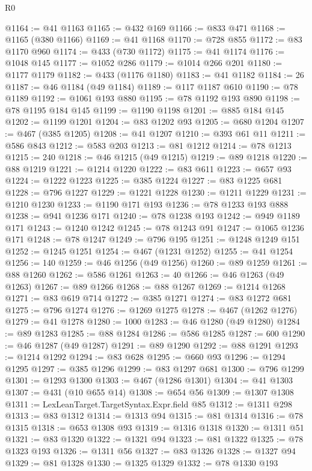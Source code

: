 \begin{lexlean}{R0}
\begin{coremodule}
@1164 := @41 @1163
@1165 := @432 @169
@1166 := @833 @471
@1168 := @1165 (@380 @1166)
@1169 := @41 @1168
@1170 := @728 @855
@1172 := @83 @1170 @960
@1174 := @433 (@730 @1172)
@1175 := @41 @1174
@1176 := @1048 @145
@1177 := @1052 @286
@1179 := @1014 @266 @201
@1180 := @1177 @1179
@1182 := @433 (@1176 @1180)
@1183 := @41 @1182
@1184 := 26
@1187 := @46 @1184 (@49 @1184)
@1189 := @117 @1187 @610
@1190 := @78 @1189
@1192 := @1061 @193 @880
@1195 := @78 @1192 @193 @890
@1198 := @78 @1195 @184 @145
@1199 := @1190 @1198
@1201 := @885 @184 @145
@1202 := @1199 @1201
@1204 := @83 @1202 @93
@1205 := @680 @1204
@1207 := @467 (@385 @1205)
@1208 := @41 @1207
@1210 := @393 @61 @11
@1211 := @586 @843
@1212 := @583 @203
@1213 := @81 @1212
@1214 := @78 @1213
@1215 := 240
@1218 := @46 @1215 (@49 @1215)
@1219 := @89 @1218
@1220 := @88 @1219
@1221 := @1214 @1220
@1222 := @83 @611
@1223 := @657 @93
@1224 := @1222 @1223
@1225 := @385 @1224
@1227 := @83 @1225 @681
@1228 := @796 @1227
@1229 := @1221 @1228
@1230 := @1211 @1229
@1231 := @1210 @1230
@1233 := @1190 @171 @193
@1236 := @78 @1233 @193 @888
@1238 := @941 @1236 @171
@1240 := @78 @1238 @193
@1242 := @949 @1189 @171
@1243 := @1240 @1242
@1245 := @78 @1243 @91
@1247 := @1065 @1236 @171
@1248 := @78 @1247
@1249 := @796 @195
@1251 := @1248 @1249 @151
@1252 := @1245 @1251
@1254 := @467 (@1231 @1252)
@1255 := @41 @1254
@1256 := 140
@1259 := @46 @1256 (@49 @1256)
@1260 := @89 @1259
@1261 := @88 @1260
@1262 := @586 @1261
@1263 := 40
@1266 := @46 @1263 (@49 @1263)
@1267 := @89 @1266
@1268 := @88 @1267
@1269 := @1214 @1268
@1271 := @83 @619 @714
@1272 := @385 @1271
@1274 := @83 @1272 @681
@1275 := @796 @1274
@1276 := @1269 @1275
@1278 := @467 (@1262 @1276)
@1279 := @41 @1278
@1280 := 1000
@1283 := @46 @1280 (@49 @1280)
@1284 := @89 @1283
@1285 := @88 @1284
@1286 := @586 @1285
@1287 := 600
@1290 := @46 @1287 (@49 @1287)
@1291 := @89 @1290
@1292 := @88 @1291
@1293 := @1214 @1292
@1294 := @83 @628
@1295 := @660 @93
@1296 := @1294 @1295
@1297 := @385 @1296
@1299 := @83 @1297 @681
@1300 := @796 @1299
@1301 := @1293 @1300
@1303 := @467 (@1286 @1301)
@1304 := @41 @1303
@1307 := @431 (@10 @655 @14)
@1308 := @654 @56
@1309 := @1307 @1308
@1311 := LexLeanTarget.TargetSyntax.Expr.field @85
@1312 := @1311 @298
@1313 := @83 @1312
@1314 := @1313 @94
@1315 := @81 @1314
@1316 := @78 @1315
@1318 := @653 @1308 @93
@1319 := @1316 @1318
@1320 := @1311 @51
@1321 := @83 @1320
@1322 := @1321 @94
@1323 := @81 @1322
@1325 := @78 @1323 @193
@1326 := @1311 @56
@1327 := @83 @1326
@1328 := @1327 @94
@1329 := @81 @1328
@1330 := @1325 @1329
@1332 := @78 @1330 @193

\end{coremodule}
\end{lexlean}
